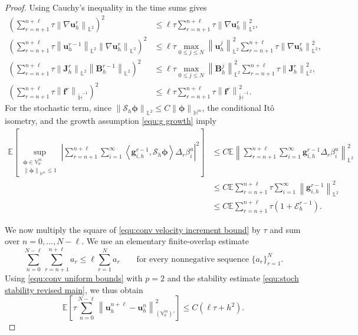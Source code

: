 \documentclass[11pt, reqno]{amsart}
\theoremstyle{definition}
\numberwithin{equation}{section}
\newcommand{\bff}{\boldsymbol}
\newcommand{\bb}{\mathbb}
\newcommand{\norm}[2]{\left\|{#1}\right\|_{#2}}
\newcommand{\inpro}[2]{\left\langle#1,#2\right\rangle}
\newcommand{\abs}[1]{\left|{#1}\right|}
\begin{document}
\begin{proof}
	Using Cauchy's inequality in the time sums gives
	\begin{align*}
		\left(
		\sum_{r=n+1}^{n+\ell}\tau
		\norm{\nabla\bff u_h^r}{\bb L^2}
		\right)^2
		&\le
		\ell\tau
		\sum_{r=n+1}^{n+\ell}\tau
		\norm{\nabla\bff u_h^r}{\bb L^2}^{2},
		\\
		\left(
		\sum_{r=n+1}^{n+\ell}\tau
		\norm{\bff u_h^{r-1}}{\bb L^2}
		\norm{\nabla\bff u_h^r}{\bb L^2}
		\right)^2
		&\le
		\ell\tau
		\max_{0\le j\le N}
		\norm{\bff u_h^j}{\bb L^2}^{2}
		\sum_{r=n+1}^{n+\ell}\tau
		\norm{\nabla\bff u_h^r}{\bb L^2}^{2},
		\\
		\left(
		\sum_{r=n+1}^{n+\ell}\tau
		\norm{\bff J_h^r}{\bb L^2}
		\norm{\bff B_h^{r-1}}{\bb L^2}
		\right)^2
		&\le
		\ell\tau
		\max_{0\le j\le N}
		\norm{\bff B_h^j}{\bb L^2}^{2}
		\sum_{r=n+1}^{n+\ell}\tau
		\norm{\bff J_h^r}{\bb L^2}^{2},
		\\
		\left(
		\sum_{r=n+1}^{n+\ell}\tau
		\norm{\bff f^r}{\widetilde{\bb H}^{-1}}
		\right)^2
		&\le
		\ell\tau
		\sum_{r=n+1}^{n+\ell}\tau
		\norm{\bff f^r}{\widetilde{\bb H}^{-1}}^2.
	\end{align*}
	For the stochastic term, since
	$\norm{\mathcal S_h\bff\phi}{\bb L^2}\le C\norm{\bff\phi}{\bb H^m}$, the
	conditional It\^o isometry, and the growth assumption \eqref{equ:g growth}
	imply
	\begin{align*}
		\bb E
		\left[
		\sup_{\substack{\bff\phi\in\bb V_\sigma^m\\
				\norm{\bff\phi}{\bb H^m}\le1}}
		\abs{
			\sum_{r=n+1}^{n+\ell}\sum_{i=1}^{\infty}
			\inpro{\bff g_{i,h}^{r-1}}{\mathcal S_h\bff\phi}
			\Delta_r\beta_i^u
		}^{2}
		\right]
		&\le
		C\bb E
		\norm{
			\sum_{r=n+1}^{n+\ell}\sum_{i=1}^{\infty}
			\bff g_{i,h}^{r-1}\Delta_r\beta_i^u
		}{\bb L^2}^{2}
		\\
		&\le
		C\bb E
		\sum_{r=n+1}^{n+\ell}\tau
		\sum_{i=1}^{\infty}
		\norm{\bff g_{i,h}^{r-1}}{\bb L^2}^{2}
		\\
		&\le
		C\bb E
		\sum_{r=n+1}^{n+\ell}\tau
		\left(1+\mathcal E_h^{r-1}\right).
	\end{align*}
	
	We now multiply the square of \eqref{equ:conv velocity increment bound} by $\tau$
	and sum over $n=0,\ldots,N-\ell$. We use an elementary finite-overlap estimate
	\begin{equation}\label{equ:finite overlap}
	\sum_{n=0}^{N-\ell}
	\sum_{r=n+1}^{n+\ell} a_r
	\le
	\ell\sum_{r=1}^{N}a_r
	\qquad
	\text{for every nonnegative sequence } \{a_r\}_{r=1}^N .
	\end{equation}
	Using \eqref{equ:conv uniform bounds} with $p=2$ and the stability estimate \eqref{equ:stoch stability revised main}, we thus obtain
	\[
	\bb E\left[\tau\sum_{n=0}^{N-\ell}
	\norm{\bff u_h^{n+\ell}-\bff u_h^n}{(\bb{V}^m_{\sigma})'}^2 \right]
	\le
	C(\ell\tau+h^2).
	\]


\end{proof}
\end{document}
